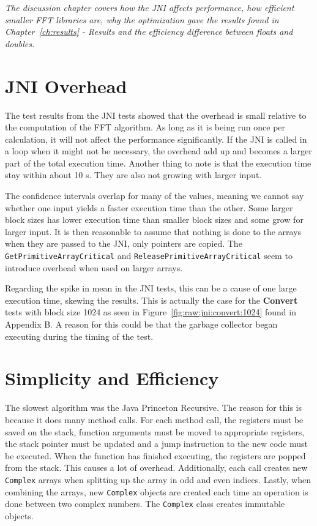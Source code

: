 \textit{The discussion chapter covers how the JNI affects performance, how efficient smaller FFT libraries are, why the optimization gave the results found in Chapter~\ref{ch:results} - Results and the efficiency difference between floats and doubles.}

\section{JNI Overhead}
The test results from the JNI tests showed that the overhead is small relative to the computation of the FFT algorithm. As long as it is being run once per calculation, it will not affect the performance significantly. If the JNI is called in a loop when it might not be necessary, the overhead add up and becomes a larger part of the total execution time. Another thing to note is that the execution time stay within about 10 \textmu s. They are also not growing with larger input.

The confidence intervals overlap for many of the values, meaning we cannot say whether one input yields a faster execution time than the other. Some larger block sizes has lower execution time than smaller block sizes and some grow for larger input. It is then reasonable to assume that nothing is done to the arrays when they are passed to the JNI, only pointers are copied. The \texttt{GetPrimitiveArrayCritical} and \texttt{ReleasePrimitiveArrayCritical} seem to introduce overhead when used on larger arrays. %

Regarding the spike in mean in the JNI tests, this can be a cause of one large execution time, skewing the results. This is actually the case for the \textbf{Convert} tests with block size 1024 as seen in Figure~\ref{fig:raw:jni:convert:1024} found in Appendix B. A reason for this could be that the garbage collector began executing during the timing of the test.

\section{Simplicity and Efficiency}

The slowest algorithm was the Java Princeton Recursive. The reason for this is because it does many method calls. For each method call, the registers must be saved on the stack, function arguments must be moved to appropriate registers, the stack pointer must be updated and a jump instruction to the new code must be executed. When the function has finished executing, the registers are popped from the stack. This causes a lot of overhead. Additionally, each call creates new \texttt{Complex} arrays when splitting up the array in odd and even indices. Lastly, when combining the arrays, new \texttt{Complex} objects are created each time an operation is done between two complex numbers. The \texttt{Complex} class creates immutable objects.

